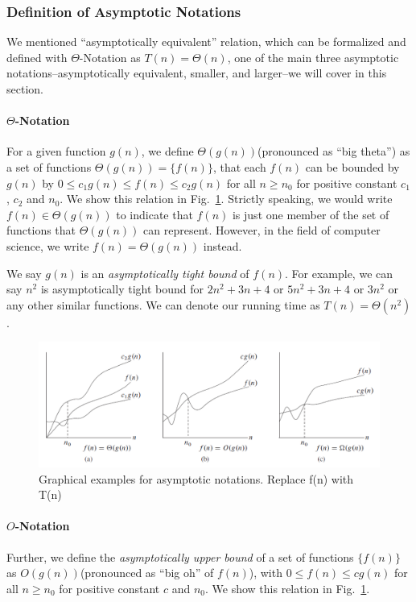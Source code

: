 \documentclass[../main.tex]{subfiles}
\begin{document}
\subsubsection{Definition of Asymptotic Notations} We mentioned ``asymptotically equivalent'' relation, which can be formalized and  defined with $\Theta$-Notation as $T(n)=\Theta(n)$, one of the main three asymptotic notations--asymptotically equivalent, smaller, and larger--we will cover in this section.
\paragraph{$\Theta$-Notation}  For a given function $g(n)$, we define $\Theta(g(n))$(pronounced as ``big theta'') as a set of functions $\Theta(g(n))=\{f(n)\}$, that each $f(n)$ can be bounded by $g(n)$ by $0 \leq c_1g(n)\leq f(n)\leq c_2g(n)$ for all $n\geq n_0$ for positive constant $c_1$, $c_2$ and $n_0$. We show this relation in Fig.~\ref{fig:asym_notation}. Strictly speaking, we would write $f(n)\in\Theta(g(n))$ to indicate that $f(n)$ is just one member of the set of functions that $\Theta(g(n))$ can represent. However, in the field of computer science, we write  $f(n)=\Theta(g(n))$ instead. 

We say $g(n)$ is an  \textit{asymptotically tight bound} of $f(n)$.  For example, we can say $n^2$ is asymptotically tight bound for $2n^2+3n+4$ or $5n^2+3n+4$ or $3n^2$ or any other similar functions. We can denote our running time as $T(n)=\Theta(n^2)$.

\begin{figure}[!ht]
    \centering
    \includegraphics[width = 1\columnwidth]{fig/notations.png}
    \caption{Graphical examples for asymptotic notations. Replace f(n) with T(n) }
    \label{fig:asym_notation}
\end{figure}

\paragraph{$O$-Notation}  Further, we define the  \textit{asymptotically upper bound} of a set of functions $\{f(n)\}$ as $O(g(n))$(pronounced as ``big oh'' of $f(n)$), with $0 \leq  f(n)\leq cg(n)$ for all $n\geq n_0$ for positive constant $c$ and $n_0$. We show this relation in Fig.~\ref{fig:asym_notation}.
\end{document}
